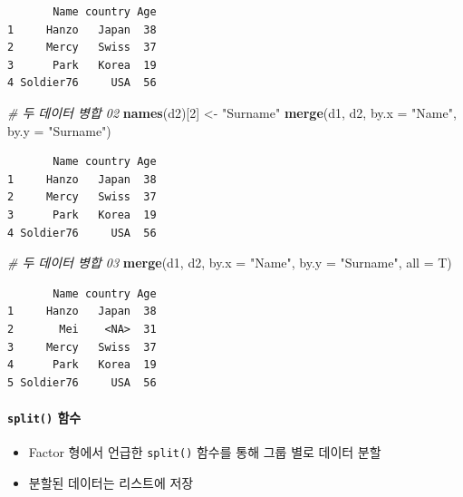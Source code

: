 \documentclass[
  11pt,
]{krantz}
\newenvironment{Shaded}{\begin{snugshade}}{\end{snugshade}}
\newcommand{\CommentTok}[1]{\textcolor[rgb]{0.37,0.37,0.37}{\textit{#1}}}
\newcommand{\DataTypeTok}[1]{\textcolor[rgb]{0.27,0.27,0.27}{#1}}
\newcommand{\DecValTok}[1]{\textcolor[rgb]{0.06,0.06,0.06}{#1}}
\newcommand{\KeywordTok}[1]{\textcolor[rgb]{0.27,0.27,0.27}{\textbf{#1}}}
\newcommand{\NormalTok}[1]{#1}
\newcommand{\StringTok}[1]{\textcolor[rgb]{0.5,0.5,0.5}{#1}}
\providecommand{\tightlist}{%
  \setlength{\itemsep}{0pt}\setlength{\parskip}{0pt}}
\begin{document}
\begin{verbatim}
       Name country Age
1     Hanzo   Japan  38
2     Mercy   Swiss  37
3      Park   Korea  19
4 Soldier76     USA  56
\end{verbatim}

\begin{Shaded}
\begin{Highlighting}[]
\CommentTok{# 두 데이터 병합 02}
\KeywordTok{names}\NormalTok{(d2)[}\DecValTok{2}\NormalTok{] <-}\StringTok{ "Surname"}
\KeywordTok{merge}\NormalTok{(d1, d2, }\DataTypeTok{by.x =} \StringTok{"Name"}\NormalTok{, }\DataTypeTok{by.y =} \StringTok{"Surname"}\NormalTok{)}
\end{Highlighting}
\end{Shaded}

\begin{verbatim}
       Name country Age
1     Hanzo   Japan  38
2     Mercy   Swiss  37
3      Park   Korea  19
4 Soldier76     USA  56
\end{verbatim}

\begin{Shaded}
\begin{Highlighting}[]
\CommentTok{# 두 데이터 병합 03}
\KeywordTok{merge}\NormalTok{(d1, d2, }
      \DataTypeTok{by.x =} \StringTok{"Name"}\NormalTok{, }\DataTypeTok{by.y =} \StringTok{"Surname"}\NormalTok{, }
      \DataTypeTok{all =}\NormalTok{ T)}
\end{Highlighting}
\end{Shaded}

\begin{verbatim}
       Name country Age
1     Hanzo   Japan  38
2       Mei    <NA>  31
3     Mercy   Swiss  37
4      Park   Korea  19
5 Soldier76     USA  56
\end{verbatim}

\normalsize

\hypertarget{split-df}{%
\paragraph{\texorpdfstring{\texttt{split()} 함수}{split() 함수}}\label{split-df}}

\begin{itemize}
\tightlist
\item
  Factor 형에서 언급한 \texttt{split()} 함수를 통해 그룹 별로 데이터 분할
\item
  분할된 데이터는 리스트에 저장
\end{itemize}
\end{document}
